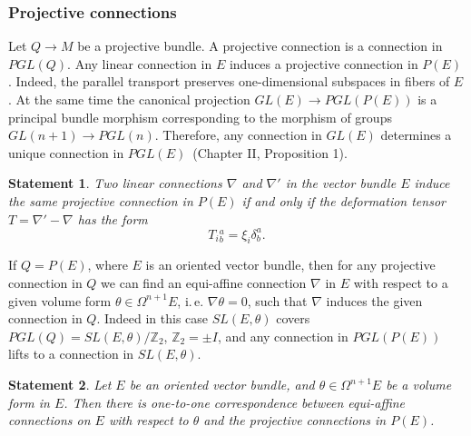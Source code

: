 \documentclass[12pt,letterpaper]{amsart}
\theoremstyle{definition}
\theoremstyle{plain}
\newtheorem{stat}{Statement}
\theoremstyle{remark}
\begin{document}
\subsubsection{Projective connections}
\label{subsubsec:4_2_3}
Let $Q \to M$ be a projective bundle.
A projective connection is a connection in $PGL(Q)$.
Any linear connection in $E$ induces a projective connection in $P(E)$.
Indeed, the parallel transport preserves one-dimensional subspaces in fibers of $E$.
At the same time the canonical projection $GL(E) \to PGL(P(E))$ is a principal bundle morphism corresponding to the morphism of groups $GL(n + 1) \to PGL(n)$.
Therefore, any connection in $GL(E)$ determines a unique connection in $PGL(E)$~\cite{kobayashi_nomizu1963}(Chapter II, Proposition 1).
\begin{stat}
Two linear connections $\nabla$ and $\nabla'$ in the vector bundle $E$ induce the same projective connection in $P(E)$ if and only if the deformation tensor $T = \nabla' - \nabla$ has the form
\begin{equation}
T_i{}^a_b = \xi_i \delta^a_b.
\label{eq:62}
\end{equation}
\label{stat:7}
\end{stat}
If $Q = P(E)$, where $E$ is an oriented vector bundle, then for any projective connection in $Q$ we can find an equi-affine connection $\nabla$ in $E$ with respect to a given volume form $\theta \in \Omega^{n + 1}E$, i.\,e. $\nabla \theta = 0$, such that $\nabla$ induces the given connection in $Q$.
Indeed in this case $SL(E, \theta)$ covers $PGL(Q) = SL(E, \theta)/\mathbb{Z}_2$, $\mathbb{Z}_2 = {\pm I}$, and any connection in $PGL(P(E))$ lifts to a connection in $SL(E, \theta)$.
\begin{stat}
Let $E$ be an oriented vector bundle, and $\theta \in \Omega^{n + 1}E$ be a volume form in $E$.
Then there is one-to-one correspondence between equi-affine connections on $E$ with respect to $\theta$ and the projective connections in $P(E)$.
\label{stat:8}
\end{stat}
\end{document}
